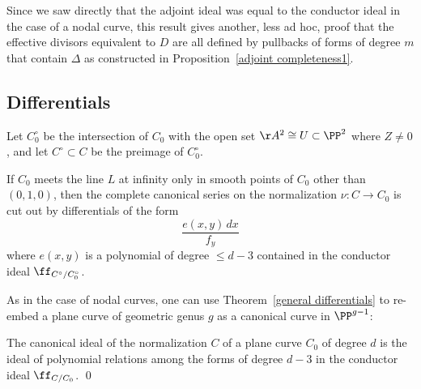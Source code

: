 Since we saw directly that the adjoint ideal was equal to the conductor
ideal in the case of
a nodal curve, this result gives another, less ad hoc, proof that the
effective divisors equivalent to $D$
are all defined by
pullbacks of forms of degree $m$ that contain $\Delta$
as constructed in Proposition~\ref{adjoint completeness1}.

\subsection*{Differentials}

Let $C^\circ_0$ be the intersection of $C_0$ with the open set
$\AA^{2}\cong U\subset \PP^{2}$ where $Z \neq 0$,
and let $C^\circ \subset C$ be the preimage of $C^\circ_0$.

\begin{theorem}\label{general differentials}
If $C_{0}$ meets the line $L$ at infinity only in smooth points of
$C_{0}$ other than $(0,1,0)$, then the complete canonical series on the
normalization $\nu: C \to C_{0}$ is cut out by differentials of the form
$$
 \frac{e(x,y)\,dx}{f_{y}}
$$
where $e(x,y)$ is a polynomial of degree $\leq d-3$ contained in the
conductor ideal $\ff_{C^{\circ}/C_{0}^{\circ}}$.
\unif
\end{theorem}

As in the case of nodal curves, one can use
Theorem~\ref{general differentials} to re-embed a plane curve of
geometric genus $g$ as a canonical curve in $\PP^{g-1}$:

\begin{corollary}
 The canonical ideal of the normalization $C$ of a plane curve $C_{0}$
%
%
%
 of degree $d$
 is the ideal of polynomial relations
 among the forms of degree $d-3$ in the
conductor ideal
 $\ff_{C/C_{0}}$. \qed
\end{corollary}

